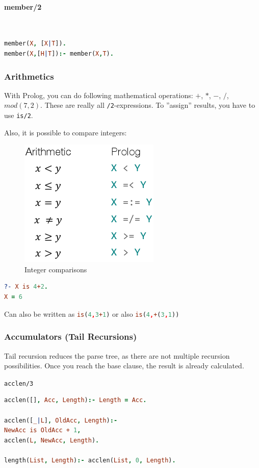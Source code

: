 \paragraph{member/2} \hfill \\

\begin{lstlisting}[language=Prolog]
member(X, [X|T]).
member(X,[H|T]):- member(X,T).
\end{lstlisting}

\subsubsection{Arithmetics}

With Prolog, you can do following mathematical operations: $+$, $*$, $-$, $/$, $mod(7,2)$. These are really all \lstinline|/2|-expressions. To ''assign'' results, you have to use \lstinline|is/2|.

Also, it is possible to compare integers:
\begin{figure}[h]
\centering
\includegraphics[width=0.2\linewidth]{images/integer_comparison}
\caption{Integer comparisons}
\label{fig:integercomparison}
\end{figure}


\begin{lstlisting}[language=Prolog]
?- X is 4+2.
X = 6
\end{lstlisting}

Can also be written as \lstinline[language=Prolog]|is(4,3+1)| or also \lstinline[language=Prolog]|is(4,+(3,1))|

\subsubsection{Accumulators (Tail Recursions)}

Tail recursion reduces the parse tree, as there are not multiple recursion possibilities. Once you reach the base clause, the result is already calculated.

\lstinline|acclen/3|

\begin{lstlisting}[language=Prolog]
acclen([], Acc, Length):- Length = Acc.

acclen([_|L], OldAcc, Length):-
NewAcc is OldAcc + 1,
acclen(L, NewAcc, Length).

length(List, Length):- acclen(List, 0, Length).
\end{lstlisting}

